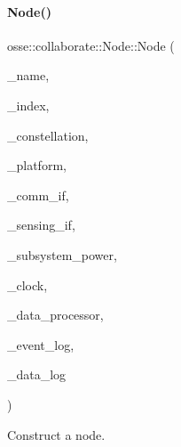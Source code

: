 \paragraph{\texorpdfstring{Node()}{Node()}}
{\footnotesize\ttfamily osse\+::collaborate\+::\+Node\+::\+Node (\begin{DoxyParamCaption}\item[{const std\+::string \&}]{\+\_\+name,  }\item[{const uint16\+\_\+t \&}]{\+\_\+index,  }\item[{const uint16\+\_\+t \&}]{\+\_\+constellation,  }\item[{const \hyperlink{classosse_1_1collaborate_1_1_platform}{Platform} $\ast$}]{\+\_\+platform,  }\item[{const \hyperlink{classosse_1_1collaborate_1_1_subsystem_comm}{Subsystem\+Comm} \&}]{\+\_\+comm\+\_\+if,  }\item[{const \hyperlink{classosse_1_1collaborate_1_1_subsystem_sensing}{Subsystem\+Sensing} \&}]{\+\_\+sensing\+\_\+if,  }\item[{const \hyperlink{classosse_1_1collaborate_1_1_subsystem_power}{Subsystem\+Power} \&}]{\+\_\+subsystem\+\_\+power,  }\item[{const \hyperlink{classosse_1_1collaborate_1_1_simulation_clock}{Simulation\+Clock} $\ast$}]{\+\_\+clock,  }\item[{\hyperlink{classosse_1_1collaborate_1_1_data_processor}{Data\+Processor} $\ast$}]{\+\_\+data\+\_\+processor,  }\item[{\hyperlink{classosse_1_1collaborate_1_1_event_logger}{Event\+Logger} $\ast$}]{\+\_\+event\+\_\+log,  }\item[{\hyperlink{classosse_1_1collaborate_1_1_data_logger}{Data\+Logger} $\ast$}]{\+\_\+data\+\_\+log }\end{DoxyParamCaption})}



Construct a node. 


